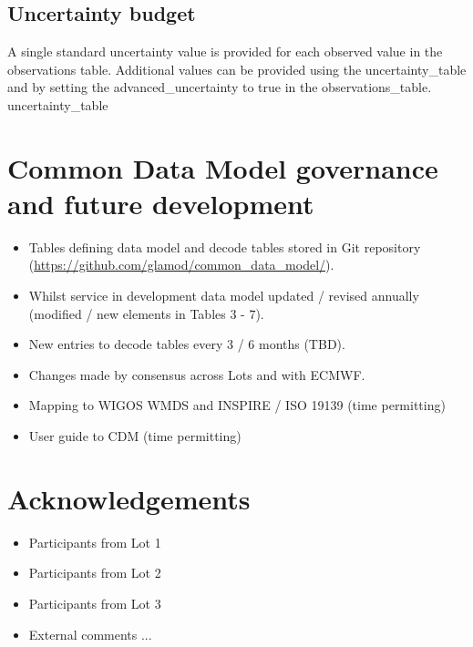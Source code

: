 \documentclass[a4paper,11pt]{article}
\begin{document}
\subsection {Uncertainty budget}
A single standard uncertainty value is provided for each observed value in the observations table. Additional values can be provided using the uncertainty\_table and by setting the advanced\_uncertainty to true in the observations\_table.\\
 {uncertainty_table}


\section {Common Data Model governance and future development}
\begin{itemize}
\item Tables defining data model and decode tables stored in Git repository (\url{https://github.com/glamod/common_data_model/}).
\item Whilst service in development data model updated / revised annually (modified / new elements in Tables 3 - 7).
\item New entries to decode tables every 3 / 6 months (TBD).
\item Changes made by consensus across Lots and with ECMWF.
\item Mapping to WIGOS WMDS and INSPIRE / ISO 19139 (time permitting)
\item User guide to CDM (time permitting)
\end{itemize}

\section {Acknowledgements}
\begin{itemize}
\item Participants from Lot 1
\item Participants from Lot 2
\item Participants from Lot 3
\item External comments ...
\end{itemize}
\end{document}
